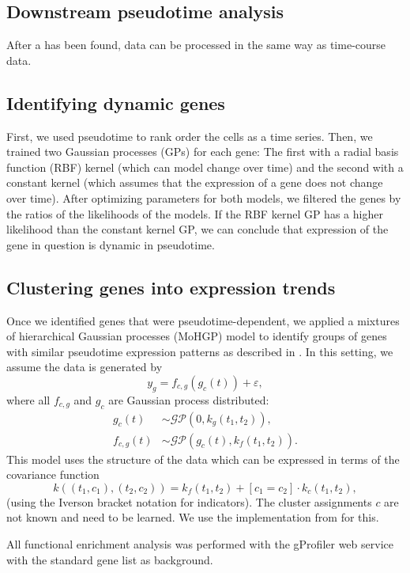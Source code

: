 \subsection{Downstream pseudotime analysis}

After a  has been found, data can be processed in the same way as time-course data.

\subsection{Identifying dynamic genes}

First, we used pseudotime to rank order the cells as a time series. Then, we trained two Gaussian processes (GPs) for each gene: The first with a radial basis function (RBF) kernel (which can model change over time) and the second with a constant kernel (which assumes that the expression of a gene does not change over time). After optimizing parameters for both models, we filtered the genes by the ratios of the likelihoods of the models. If the RBF kernel GP has a higher likelihood than the constant kernel GP, we can conclude that expression of the gene in question is dynamic in pseudotime.

\subsection{Clustering genes into expression trends}

Once we identified genes that were pseudotime-dependent, we applied a mixtures of hierarchical Gaussian processes (MoHGP) model to identify groups of genes with similar pseudotime expression patterns as described in \cite{Hensman2015-op}. In this setting, we assume the data is generated by
\[
    y_g = f_{c, g} ( g_c(t) ) + \varepsilon,
\]
where all \(  f_{c, g} \) and \( g_c \) are Gaussian process distributed:
\begin{align*}
    g_c(t) & \sim \mathcal{GP}(0, k_g(t_1, t_2)), \\
    f_{c, g}(t) & \sim \mathcal{GP}(g_c(t), k_f(t_1, t_2)).
\end{align*}
 This model uses the structure of the data which can be expressed in terms of the covariance function
\[
    k((t_1, c_1), (t_2, c_2)) = k_f(t_1, t_2) + [c_1 = c_2] \cdot k_c(t_1, t_2),
\]
(using the Iverson bracket notation for indicators). The cluster assignments \( c \) are not known and need to be learned. We use the implementation from \cite{Hensman2015-op} for this.

 All functional enrichment analysis was performed with the gProfiler \cite{Reimand2011-ht} web service with the standard gene list as background.
